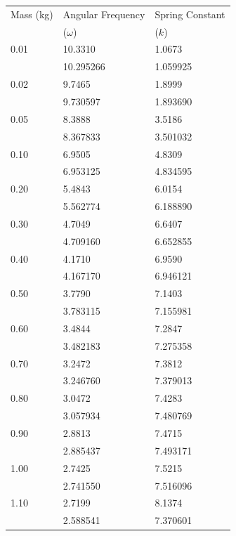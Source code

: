 \documentclass{article}
\numberwithin{figure}{section}
\numberwithin{table}{section}
\begin{document}
\begin{tabular}{lll} 
        \toprule
		Mass (kg) & Angular Frequency & Spring Constant \\
                    & ($\omega$) & ($k$) \\ 
        \midrule 
		0.01 & 10.3310 & 1.0673 \\ 
		& 10.295266 & 1.059925 \\
		0.02 & 9.7465 & 1.8999 \\ 
		& 9.730597 & 1.893690 \\
		0.05 & 8.3888 & 3.5186 \\ 
		& 8.367833 & 3.501032 \\
		0.10 & 6.9505 & 4.8309 \\ 
		& 6.953125 & 4.834595 \\
		0.20 & 5.4843 & 6.0154 \\ 
		& 5.562774 & 6.188890 \\
		0.30 & 4.7049 & 6.6407 \\ 
		& 4.709160 & 6.652855 \\
		0.40 & 4.1710 & 6.9590 \\ 
		& 4.167170 & 6.946121 \\
		0.50 & 3.7790 & 7.1403 \\ 
		& 3.783115 & 7.155981 \\
		0.60 & 3.4844 & 7.2847 \\ 
		& 3.482183 & 7.275358 \\
		0.70 & 3.2472 & 7.3812 \\ 
		& 3.246760 & 7.379013 \\
		0.80 & 3.0472 & 7.4283 \\ 
		& 3.057934 & 7.480769 \\
		0.90 & 2.8813 & 7.4715 \\ 
		& 2.885437 & 7.493171 \\
		1.00 & 2.7425 & 7.5215 \\ 
		& 2.741550 & 7.516096 \\
		1.10 & 2.7199 & 8.1374 \\ 
		& 2.588541 & 7.370601 \\ 
        \bottomrule
\end{tabular} 
\end{document}
